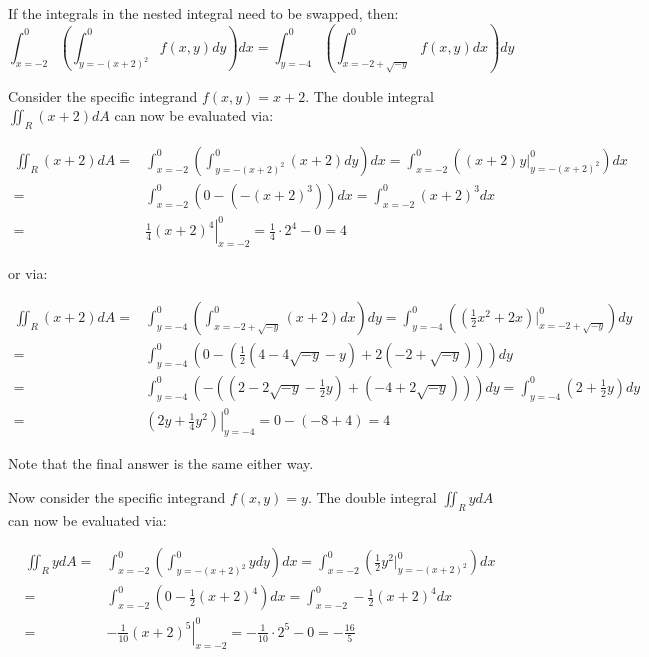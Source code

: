 \documentclass{article}
\begin{document}
If the integrals in the nested integral need to be swapped, then:
\[\int_{x = -2}^0 \left(\int_{y = -(x + 2)^2}^0 f(x,y)dy\right)dx = \int_{y = -4}^0 \left(\int_{x = -2 + \sqrt{-y}}^{0} f(x,y)dx\right)dy\]

Consider the specific integrand \(f(x, y) = x + 2\). The double integral \(\iint_R (x + 2)dA\) can now be evaluated via:

\begin{align*}
\iint_R (x + 2)dA = & \int_{x = -2}^0 \left(\int_{y = -(x + 2)^2}^{0} (x + 2)dy\right)dx 
= \int_{x = -2}^0 \left((x + 2)y\Big|_{y = -(x + 2)^2}^{0} \right)dx \\
= & \int_{x = -2}^0 \left(0 - (-(x + 2)^3) \right)dx 
= \int_{x = -2}^0 (x + 2)^3 dx \\  
= & \left.\frac{1}{4}(x + 2)^4\right|_{x = -2}^0 
= \frac{1}{4} \cdot 2^4 - 0 
= 4
\end{align*}

or via:

\begin{align*} 
\iint_R (x + 2)dA = & \int_{y = -4}^0 \left(\int_{x = -2 + \sqrt{-y}}^{0} (x + 2)dx\right)dy 
= \int_{y = -4}^0 \left((\frac{1}{2}x^2 + 2x)\bigg|_{x = -2 + \sqrt{-y}}^{0}\right)dy \\ 
= & \int_{y = -4}^0 \left(0 - (\frac{1}{2}(4 - 4\sqrt{-y} - y) + 2(-2 + \sqrt{-y}))\right)dy \\
= & \int_{y = -4}^0 \left(-((2 - 2\sqrt{-y} - \frac{1}{2}y) + (-4 + 2\sqrt{-y}))\right)dy 
= \int_{y = -4}^0 \left(2 + \frac{1}{2}y\right)dy \\
= & \left.(2y + \frac{1}{4}y^2)\right|_{y = -4}^0   
= 0 - (-8 + 4)
= 4
\end{align*} 

Note that the final answer is the same either way.

Now consider the specific integrand \(f(x, y) = y\). The double integral \(\iint_R y dA\) can now be evaluated via:

\begin{align*}
\iint_R y dA = & \int_{x = -2}^0 \left(\int_{y = -(x + 2)^2}^{0} y dy\right)dx 
= \int_{x = -2}^0 \left(\frac{1}{2}y^2\Big|_{y = -(x + 2)^2}^{0} \right)dx \\
= & \int_{x = -2}^0 \left(0 - \frac{1}{2}(x + 2)^4 \right)dx 
= \int_{x = -2}^0 -\frac{1}{2}(x + 2)^4 dx \\  
= & \left.-\frac{1}{10}(x + 2)^5\right|_{x = -2}^0 
= -\frac{1}{10} \cdot 2^5 - 0 
= -\frac{16}{5}
\end{align*}
\end{document}
